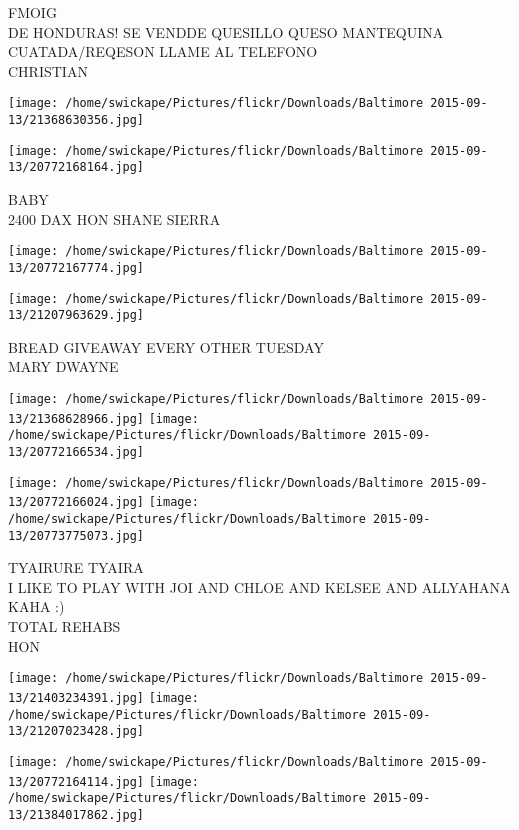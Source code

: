 \documentclass[10pt,letterpaper]{article}
\begin{document}
FMOIG\\
DE HONDURAS!  SE VENDDE QUESILLO QUESO MANTEQUINA CUATADA/REQESON LLAME AL TELEFONO\\
CHRISTIAN\\
\pagebreak

\texttt{[image: /home/swickape/Pictures/flickr/Downloads/Baltimore 2015-09-13/21368630356.jpg]}

\vspace{0.25in}
\texttt{[image: /home/swickape/Pictures/flickr/Downloads/Baltimore 2015-09-13/20772168164.jpg]}

BABY\\
2400 DAX HON SHANE SIERRA\\
\pagebreak

\texttt{[image: /home/swickape/Pictures/flickr/Downloads/Baltimore 2015-09-13/20772167774.jpg]}

\vspace{0.25in}
\texttt{[image: /home/swickape/Pictures/flickr/Downloads/Baltimore 2015-09-13/21207963629.jpg]}

BREAD GIVEAWAY EVERY OTHER TUESDAY\\
MARY DWAYNE\\
\pagebreak

\texttt{[image: /home/swickape/Pictures/flickr/Downloads/Baltimore 2015-09-13/21368628966.jpg]}
\texttt{[image: /home/swickape/Pictures/flickr/Downloads/Baltimore 2015-09-13/20772166534.jpg]}

\texttt{[image: /home/swickape/Pictures/flickr/Downloads/Baltimore 2015-09-13/20772166024.jpg]}
\texttt{[image: /home/swickape/Pictures/flickr/Downloads/Baltimore 2015-09-13/20773775073.jpg]}

TYAIRURE TYAIRA\\
I LIKE TO PLAY WITH JOI AND CHLOE AND KELSEE AND ALLYAHANA KAHA :)\\
TOTAL REHABS\\
HON\\
\pagebreak

\texttt{[image: /home/swickape/Pictures/flickr/Downloads/Baltimore 2015-09-13/21403234391.jpg]}
\texttt{[image: /home/swickape/Pictures/flickr/Downloads/Baltimore 2015-09-13/21207023428.jpg]}

\texttt{[image: /home/swickape/Pictures/flickr/Downloads/Baltimore 2015-09-13/20772164114.jpg]}
\texttt{[image: /home/swickape/Pictures/flickr/Downloads/Baltimore 2015-09-13/21384017862.jpg]}
\end{document}
